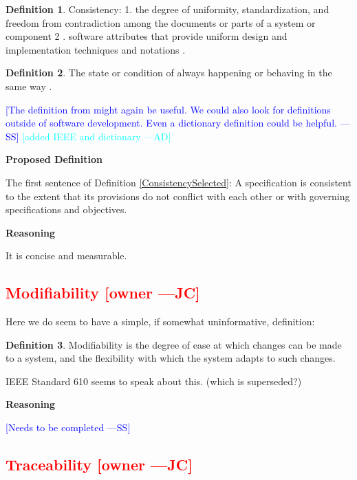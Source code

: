 \documentclass[letterpaper, cleveref]{lipics-v2019}
\newcommand{\authornote}[3]{\textcolor{#1}{[#3 ---#2]}}
\newcommand{\authornote}[3]{}
\newcommand{\wss}[1]{\authornote{blue}{SS}{#1}} %
\newcommand{\jc}[1]{\authornote{red}{JC}{#1}} %
\newcommand{\ad}[1]{\authornote{cyan}{AD}{#1}} %
\newcommand{\notdone}[1]{\textcolor{red}{#1}}
\theoremstyle{definition}
\newtheorem{defn}{Definition}
\begin{document}
\begin{defn}
  Consistency: 1. the degree of uniformity, standardization, and freedom
  from contradiction among the documents or parts of a system or component 2
  . software attributes that provide uniform design and implementation
  techniques and notations \citep{ISO/IEC/IEEE24765}.
\end{defn}

\begin{defn}
The state or condition of always happening or behaving in the same way
\citep{CambridgeConsistency2019}.
\end{defn}

\wss{The definition from \citet{IEEE1998} might again be useful.  We could also
  look for definitions outside of software development.  Even a dictionary
  definition could be helpful.}
\ad{added IEEE and dictionary}

\noindent \textbf{Proposed Definition} 

The first sentence of Definition \ref{ConsistencySelected}: A specification is
consistent to the extent that its provisions do not conflict with each other or
with governing specifications and objectives.

\noindent \textbf{Reasoning}

It is concise and measurable.


\subsection{\notdone{Modifiability} \jc{owner}}

Here we do seem to have a simple, if somewhat uninformative, definition:

\begin{defn}
  Modifiability is the degree of ease at which changes can be made to a
  system, and the flexibility with which the system adapts to such changes.
\end{defn}

IEEE Standard 610 seems to speak about this. (which is superseded?)

\noindent \textbf{Reasoning}

\wss{Needs to be completed}

\subsection{\notdone{Traceability} \jc{owner}}
\end{document}

